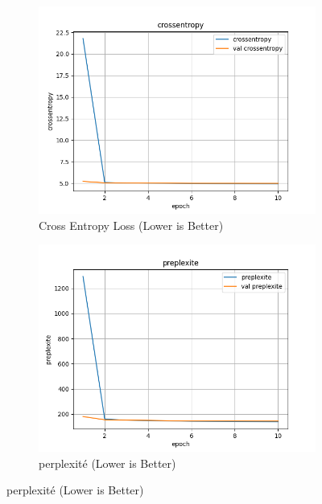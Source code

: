 \documentclass[a4paper]{article}
\begin{document}
\begin{figure}[ht]
  \centering
  \begin{subfigure}{0.47\textwidth}
    \includegraphics[width=\linewidth]{../logs/word2vect/crossentropy.png}
    \caption{Cross Entropy Loss (Lower is Better)}
  \end{subfigure}
  \hfill
  \begin{subfigure}{0.47\textwidth}
    \includegraphics[width=\linewidth]{../logs/word2vect/preplexite.png}
    \caption{perplexité (Lower is Better)}
  \end{subfigure}


\end{figure}
\end{document}
